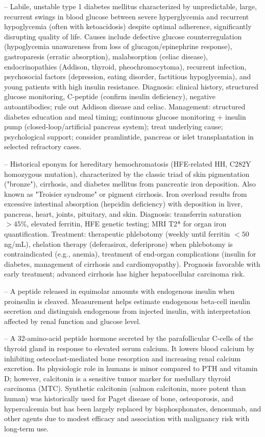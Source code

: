 -- Labile, unstable type 1 diabetes mellitus characterized by unpredictable, large, recurrent swings in blood glucose between severe hyperglycemia and recurrent hypoglycemia (often with ketoacidosis) despite optimal adherence, significantly disrupting quality of life. Causes include defective glucose counterregulation (hypoglycemia unawareness from loss of glucagon/epinephrine response), gastroparesis (erratic absorption), malabsorption (celiac disease), endocrinopathies (Addison, thyroid, pheochromocytoma), recurrent infection, psychosocial factors (depression, eating disorder, factitious hypoglycemia), and young patients with high insulin resistance. Diagnosis: clinical history, structured glucose monitoring, C-peptide (confirm insulin deficiency), negative autoantibodies; rule out Addison disease and celiac. Management: structured diabetes education and meal timing; continuous glucose monitoring + insulin pump (closed-loop/artificial pancreas system); treat underlying cause; psychological support; consider pramlintide, pancreas or islet transplantation in selected refractory cases.

-- Historical eponym for hereditary hemochromatosis (HFE-related HH, C282Y homozygous mutation), characterized by the classic triad of skin pigmentation ("bronze"), cirrhosis, and diabetes mellitus from pancreatic iron deposition. Also known as "Troisier syndrome" or pigment cirrhosis. Iron overload results from excessive intestinal absorption (hepcidin deficiency) with deposition in liver, pancreas, heart, joints, pituitary, and skin. Diagnosis: transferrin saturation $> 45\%$, elevated ferritin, HFE genetic testing; MRI T2* for organ iron quantification. Treatment: therapeutic phlebotomy (weekly until ferritin $< 50$ ng/mL), chelation therapy (deferasirox, deferiprone) when phlebotomy is contraindicated (e.g., anemia), treatment of end-organ complications (insulin for diabetes, management of cirrhosis and cardiomyopathy). Prognosis favorable with early treatment; advanced cirrhosis has higher hepatocellular carcinoma risk.

-- A peptide released in equimolar amounts with endogenous insulin when proinsulin is cleaved. Measurement helps estimate endogenous beta-cell insulin secretion and distinguish endogenous from injected insulin, with interpretation affected by renal function and glucose level.

-- A 32-amino-acid peptide hormone secreted by the parafollicular C-cells of the thyroid gland in response to elevated serum calcium. It lowers blood calcium by inhibiting osteoclast-mediated bone resorption and increasing renal calcium excretion. Its physiologic role in humans is minor compared to PTH and vitamin D; however, calcitonin is a sensitive tumor marker for medullary thyroid carcinoma (MTC). Synthetic calcitonin (salmon calcitonin, more potent than human) was historically used for Paget disease of bone, osteoporosis, and hypercalcemia but has been largely replaced by bisphosphonates, denosumab, and other agents due to modest efficacy and association with malignancy risk with long-term use.

